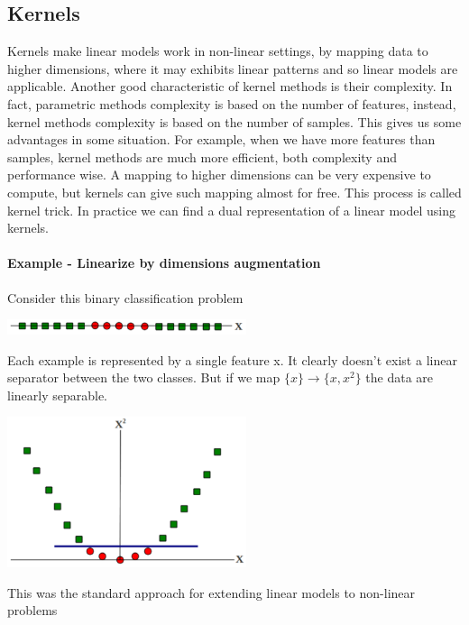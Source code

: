 \documentclass[main.tex]{subfiles}
\begin{document}
\subsection{Kernels}
Kernels make linear models work in non-linear settings, by mapping data to higher dimensions, where it may exhibits linear patterns and so linear models are applicable. Another good characteristic of kernel methods is their complexity. In fact, parametric methods complexity is based on the number of features, instead, kernel methods complexity is based on the number of samples. This gives us some advantages in some situation. For example, when we have more features than samples, kernel methods are much more efficient, both complexity and performance wise.
A mapping to higher dimensions can be very expensive to compute, but kernels can give such mapping almost for free. This process is called kernel trick. In practice we can find a dual representation of a linear model using kernels.
\paragraph{Example - Linearize by dimensions augmentation} Consider this binary classification problem

\begin{center}
    \includegraphics[width=70mm]{img/Add_Dimension.PNG}
\end{center}

Each example is represented by a single feature x. It clearly doesn't exist a linear separator between the two classes. But if we map $\{x\} \rightarrow \{x,x^2\}$ the data are linearly separable.

\begin{center}
    \includegraphics[width=70mm]{img/Add_Dimension2.PNG}
\end{center}
This was the standard approach for extending linear models to non-linear problems
\end{document}
